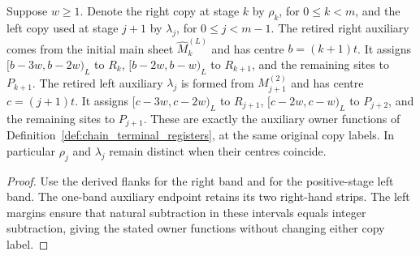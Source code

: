 \begin{lemma}
    \label{thm:chain_sweep_retired_copies}
    \leanok
    Suppose $w\ge1$.
    Denote the right copy at stage $k$ by $\rho_k$, for $0\le k<m$,
    and the left copy used at stage $j+1$ by $\lambda_j$, for
    $0\le j<m-1$. The retired right auxiliary comes from the
    initial main sheet $\widehat M_k^{(L)}$ and has centre $b=(k+1)t$.
    It assigns $[b-3w,b-2w)_L$ to $R_k$,
    $[b-2w,b-w)_L$ to $R_{k+1}$, and the remaining sites to $P_{k+1}$.
    The retired left auxiliary $\lambda_j$ is formed from
    $M_{j+1}^{(2)}$ and has centre $c=(j+1)t$.
    It assigns $[c-3w,c-2w)_L$ to $R_{j+1}$,
    $[c-2w,c-w)_L$ to $P_{j+2}$, and the remaining sites to $P_{j+1}$.
    These are exactly the auxiliary owner functions of
    Definition~\ref{def:chain_terminal_registers}, at the same original
    copy labels. In particular $\rho_j$ and $\lambda_j$ remain distinct
    when their centres coincide.
\end{lemma}
\begin{proof}\leanok
    Use the derived flanks for the right band and for the positive-stage
    left band. The one-band auxiliary endpoint retains its two right-hand
    strips. The left margins ensure that natural subtraction in these
    intervals equals integer subtraction, giving the stated owner
    functions without changing either copy label.
\end{proof}

